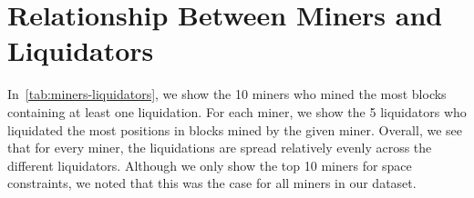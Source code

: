 \section{Relationship Between Miners and Liquidators}
\label{sec:miners-liquidators}
In~\autoref{tab:miners-liquidators}, we show the 10 miners who mined the most blocks containing at least one liquidation.
For each miner, we show the 5 liquidators who liquidated the most positions in blocks mined by the given miner.
Overall, we see that for every miner, the liquidations are spread relatively evenly across the different liquidators.
Although we only show the top 10 miners for space constraints, we noted that this was the case for all miners in our dataset.


\hypersetup{hidelinks}
\renewcommand{\contractaddr}[2][\ssmall]{{#1\href{https://etherscan.io/token/#2}{\texttt{#2}}}}
